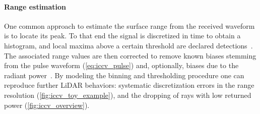 \paragraph{Range estimation}
One common approach to estimate the surface range from the received waveform is to locate its peak. To that end the signal is discretized in time to obtain a histogram, and local maxima above a certain threshold are declared detections~\cite{winiwarter2022virtual}. The associated range values are then corrected to remove known biases stemming from the pulse waveform (\cf \cref{eq:iccv_pulse}) and, optionally, biases due to the radiant power~\cite{winiwarter2022virtual}.
By modeling the binning and thresholding procedure one can reproduce further LiDAR  behaviors: systematic discretization errors in the range resolution (\cf \cref{fig:iccv_toy_example}), and the dropping of rays with low returned power (\cf \cref{fig:iccv_overview}).


